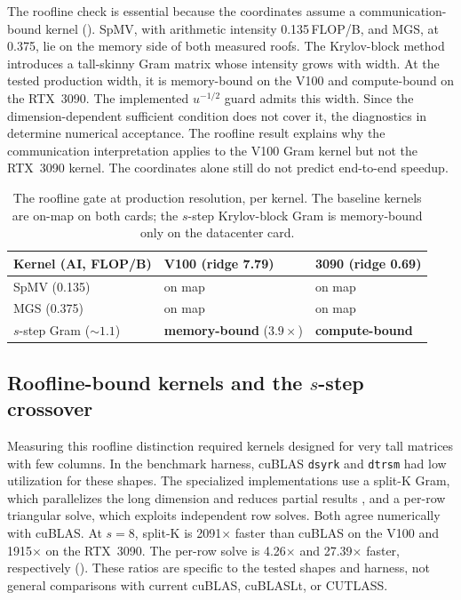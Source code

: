 The roofline check is essential because the coordinates assume a communication-bound kernel (). SpMV, with arithmetic intensity 0.135\,FLOP/B, and MGS, at 0.375, lie on the memory side of both measured roofs. The Krylov-block method introduces a tall-skinny Gram matrix whose intensity grows with width. At the tested production width, it is memory-bound on the V100 and compute-bound on the RTX~3090. The implemented $u^{-1/2}$ guard admits this width. Since the dimension-dependent sufficient condition does not cover it, the diagnostics in  determine numerical acceptance. The roofline result explains why the communication interpretation applies to the V100 Gram kernel but not the RTX~3090 kernel. The coordinates alone still do not predict end-to-end speedup.

\begin{table}[htbp!]
\centering
\caption{The roofline gate at production resolution, per kernel. The baseline kernels are
on-map on both cards; the $s$-step Krylov-block Gram is memory-bound only on the datacenter card.}
\label{tab:gpu-gate}
\begin{tabular}{@{}lll@{}}
\toprule
\textbf{Kernel (AI, FLOP/B)} & \textbf{V100 (ridge 7.79)} & \textbf{3090 (ridge 0.69)} \\
\midrule
SpMV (0.135)                 & on map & on map \\
MGS (0.375)                  & on map & on map \\
$s$-step Gram (${\sim}1.1$)  & \textbf{memory-bound} ($3.9\times$) & \textbf{compute-bound} \\
\bottomrule
\end{tabular}
\end{table}

\subsection{Roofline-bound kernels and the $s$-step crossover}\label{sec:gpu-sstep}

Measuring this roofline distinction required kernels designed for very tall matrices with few columns. In the benchmark harness, cuBLAS \texttt{dsyrk} and \texttt{dtrsm} had low utilization for these shapes. The specialized implementations use a split-K Gram, which parallelizes the long dimension and reduces partial results \cite{ernst-2021}, and a per-row triangular solve, which exploits independent row solves. Both agree numerically with cuBLAS. At $s=8$, split-K is 2091$\times$ faster than cuBLAS on the V100 and 1915$\times$ on the RTX~3090. The per-row solve is 4.26$\times$ and 27.39$\times$ faster, respectively (). These ratios are specific to the tested shapes and harness, not general comparisons with current cuBLAS, cuBLASLt, or CUTLASS.

